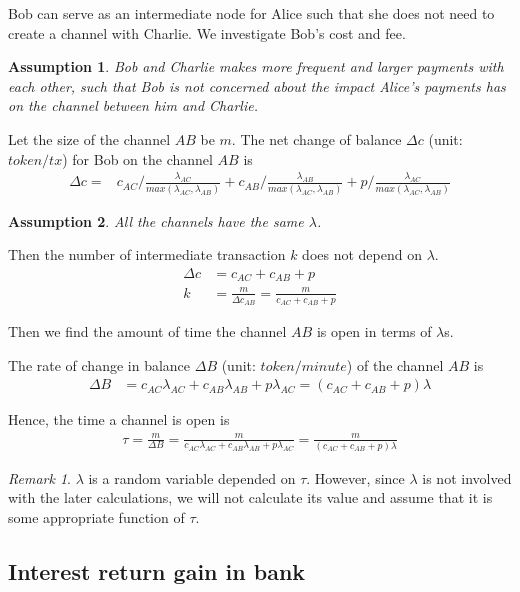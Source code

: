 \documentclass[12pt]{article}
\theoremstyle{plain}
\newtheorem{assumption}{Assumption}
\theoremstyle{remark}
\newtheorem{remark}{Remark}
\theoremstyle{definition}
\begin{document}
Bob can serve as an intermediate node for Alice such that she does not need to create a channel with Charlie. We investigate Bob's cost and fee. 
\begin{assumption}
    Bob and Charlie makes more frequent and larger payments with each other, such that Bob is not concerned about the impact Alice's payments has on the channel between him and Charlie.
\end{assumption}
Let the size of the channel $AB$ be $m$.
The net change of balance $\Delta c$ (unit: $token/tx$) for Bob on the channel $AB$ is  
\begin{align}
    \Delta c = &c_{AC}/\frac{\lambda_{AC}}{max(\lambda_{AC},\lambda_{AB})}+c_{AB}/\frac{\lambda_{AB}}{max(\lambda_{AC},\lambda_{AB})}+p/\frac{\lambda_{AC}}{max(\lambda_{AC},\lambda_{AB})}
\end{align}
\begin{assumption}
    All the channels have the same $\lambda$.
\end{assumption}
Then the number of intermediate transaction $k$ does not depend on $\lambda$. 
\begin{align}
    \Delta c& = c_{AC}+c_{AB}+p\\
    k &= \frac{m}{\Delta c_{AB}} = \frac{m}{c_{AC}+c_{AB}+p}
\end{align}

Then we find the amount of time the channel $AB$ is open in terms of $\lambda$s. 

The rate of change in balance $\Delta B$ (unit: $token/minute$) of the channel $AB$ is 
\begin{align}
    \Delta B &= c_{AC}\lambda_{AC}+c_{AB}\lambda_{AB}+p\lambda_{AC} = (c_{AC}+c_{AB}+p)\lambda
\end{align}

Hence, the time a channel is open is 
\begin{align}
    \tau = \frac{m}{\Delta B} = \frac{m}{c_{AC}\lambda_{AC}+c_{AB}\lambda_{AB}+p\lambda_{AC}}=\frac{m}{(c_{AC}+c_{AB}+p)\lambda}
\end{align}
\begin{remark}
    $\lambda$ is a random variable depended on $\tau$. However, since $\lambda$ is not involved with the later calculations, we will not calculate its value and assume that it is some appropriate function of $\tau$. 
\end{remark}

\subsection{Interest return gain in bank}
\end{document}
